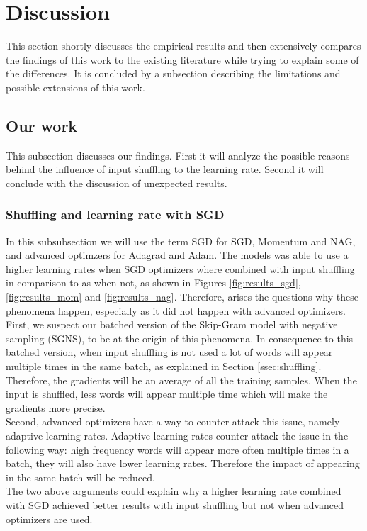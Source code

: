 \section{Discussion}\label{sec:discussion}

This section shortly discusses the empirical results and then extensively compares the findings of this work to the existing literature while trying to explain some of the differences. It is concluded by a subsection describing the limitations and possible extensions of this work. 

\subsection{Our work}
This subsection discusses our findings. First it will analyze the possible reasons behind the influence of input shuffling to the learning rate. Second it will conclude with the discussion of unexpected results. 

\subsubsection{Shuffling and learning rate with SGD}
In this subsubsection we will use the term SGD for SGD, Momentum and NAG, and advanced optimzers for Adagrad and Adam. The models was able to use a higher learning rates when SGD optimizers where combined with input shuffling in comparison to as when not, as shown in Figures \ref{fig:results_sgd}, \ref{fig:results_mom} and \ref{fig:results_nag}. Therefore, arises the questions why these phenomena happen, especially as it did not happen with advanced optimizers.  \\
First, we suspect our batched version of the Skip-Gram model with negative sampling (SGNS), to be at the origin of this phenomena. In consequence to this batched version, when input shuffling is not used a lot of words will appear multiple times in the same batch, as explained in Section \ref{ssec:shuffling}. Therefore, the gradients will be an average of all the training samples. When the input is shuffled, less words will appear multiple time which will make the gradients more precise.\\
Second, advanced optimizers have a way to counter-attack this issue, namely adaptive learning rates. Adaptive learning rates counter attack the issue in the following way: high frequency words  will appear more often multiple times in a batch, they will also have lower learning rates. Therefore the impact of appearing in the same batch will be reduced. \\  The two above arguments could explain why a higher learning rate combined with SGD achieved better results with input shuffling but not when advanced optimizers are used. 

